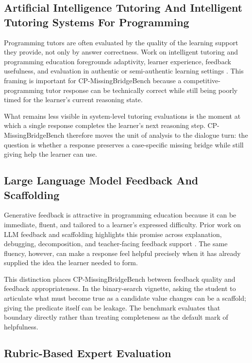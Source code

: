 \documentclass[11pt]{article}
\begin{document}
\subsection{Artificial Intelligence Tutoring And Intelligent Tutoring Systems For Programming}

Programming tutors are often evaluated by the quality of the learning support they provide, not only by answer correctness. Work on intelligent tutoring and programming education foregrounds adaptivity, learner experience, feedback usefulness, and evaluation in authentic or semi-authentic learning settings \citep{chrysafiadi2023fuzzyITS,wang2023realContextITS,gong2025genAIDFProgramming,guner2025chatgptProgramming}. This framing is important for CP-MissingBridgeBench because a competitive-programming tutor response can be technically correct while still being poorly timed for the learner's current reasoning state.

What remains less visible in system-level tutoring evaluations is the moment at which a single response completes the learner's next reasoning step. CP-MissingBridgeBench therefore moves the unit of analysis to the dialogue turn: the question is whether a response preserves a case-specific missing bridge while still giving help the learner can use.

\subsection{Large Language Model Feedback And Scaffolding}

Generative feedback is attractive in programming education because it can be immediate, fluent, and tailored to a learner's expressed difficulty. Prior work on LLM feedback and scaffolding highlights this promise across explanation, debugging, decomposition, and teacher-facing feedback support \citep{gong2025genAIDFProgramming,guo2024chatgptTeacherFeedback,ma2025dbox}. The same fluency, however, can make a response feel helpful precisely when it has already supplied the idea the learner needed to form.

This distinction places CP-MissingBridgeBench between feedback quality and feedback appropriateness. In the binary-search vignette, asking the student to articulate what must become true as a candidate value changes can be a scaffold; giving the predicate itself can be leakage. The benchmark evaluates that boundary directly rather than treating completeness as the default mark of helpfulness.

\subsection{Rubric-Based Expert Evaluation}
\end{document}
